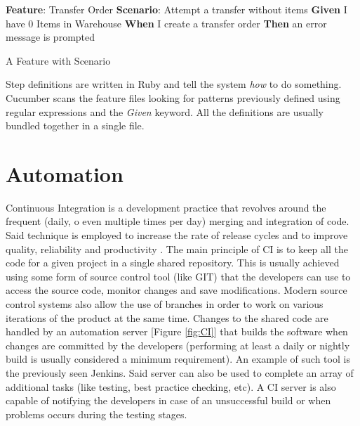 \begin{algorithm}[H]
\SetAlgoLined
\textbf{Feature}: Transfer Order\;
    \hspace{5mm} \textbf{Scenario}: Attempt a transfer without items\;
        \hspace{10mm} \textbf{Given} I have 0 Items in Warehouse\;
        \hspace{10mm} \textbf{When} I create a transfer order\;
        \hspace{10mm} \textbf{Then} an error message is prompted\;
\caption{A Feature with Scenario}
\label{alg:featureWithScenario}
\end{algorithm}


Step definitions are written in Ruby and tell the system \textit{how} to do something. Cucumber scans the feature files looking for patterns previously defined using regular expressions and the \textit{Given} keyword. All the definitions are usually bundled together in a single file.
\section{Automation}

Continuous Integration \cite{CIBook} is a development practice that revolves around the frequent (daily, o even multiple times per day) merging and integration of code. Said technique is employed to increase the rate of release cycles and to improve quality, reliability and productivity \cite{CIArticle}. The main principle of CI is to keep all the code for a given project in a single shared repository. This is usually achieved using some form of source control tool (like GIT) that the developers can use to access the source code, monitor changes and save modifications. Modern source control systems also allow the use of branches in order to work on various iterations of the product at the same time. Changes to the shared code are handled by an automation server [Figure \ref{fig:CI}] that builds the software when changes are committed by the developers (performing at least a daily or nightly build is usually considered a minimum requirement). An example of such tool is the previously seen Jenkins. Said server can also be used to complete an array of additional tasks (like testing, best practice checking, etc). A CI server is also capable of notifying the developers in case of an unsuccessful build or when problems occurs during the testing stages.


